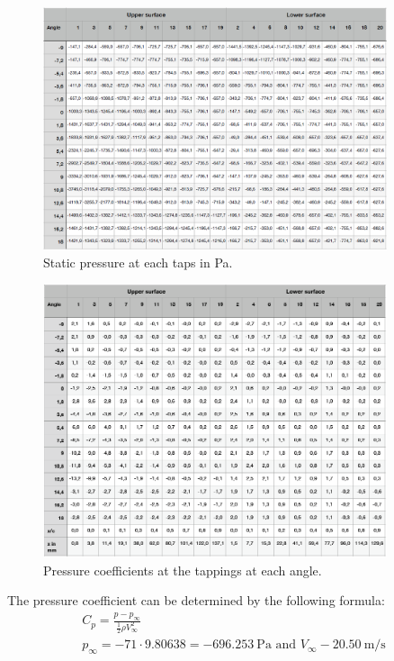 \documentclass[11pt]{article}
\begin{document}
\begin{figure}[H]
  \centering
  \includegraphics[width=0.9\textwidth]{./img/diagram8.png}
  \caption{Static pressure at each taps in \si{\pascal}.}
  \label{staticpressure}
\end{figure}
\begin{figure}[H]
  \centering
  \includegraphics[width=0.9\textwidth]{./img/diagram9.png}
  \caption{Pressure coefficients at the tappings at each angle.}
\end{figure}
The pressure coefficient can be determined by the following formula:
\begin{gather}
  C_p = \frac{p - p_{\infty}}{\frac{1}{2}\rho V_{\infty}^2}\\
  p_{\infty} = -71\cdot 9.80638 = \SI{-696.253}{\pascal} \textrm{ and } V_{\infty} - \SI{20.50}{\meter\per\second}
\end{gather}
\end{document}
